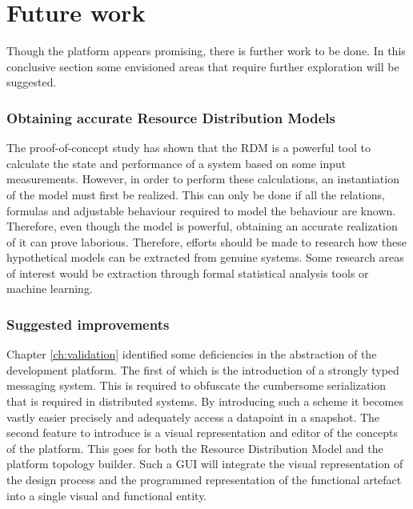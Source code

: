 \section{Future work}
Though the platform appears promising, there is further work to be done. In this conclusive section some envisioned areas that require further exploration will be suggested.

\subsubsection{Obtaining accurate Resource Distribution Models}
The proof-of-concept study has shown that the RDM is a powerful tool to calculate the state and performance of a system based on some input measurements. However, in order to perform these calculations, an instantiation of the model must first be realized. This can only be done if all the relations, formulas and adjustable behaviour required to model the behaviour are known. Therefore, even though the model is powerful, obtaining an accurate realization of it can prove laborious. Therefore, efforts should be made to research how these hypothetical models can be extracted from genuine systems. Some research areas of interest would be extraction through formal statistical analysis tools or machine learning.

\subsubsection{Suggested improvements}
Chapter \ref{ch:validation} identified some deficiencies in the abstraction of the development platform. The first of which is the introduction of a strongly typed messaging system. This is required to obfuscate the cumbersome serialization that is required in distributed systems. By introducing such a scheme it becomes vastly easier precisely and adequately access a datapoint in a snapshot.
The second feature to introduce is a visual representation and editor of the concepts of the platform. This goes for both the Resource Distribution Model and the platform topology builder. Such a GUI will integrate the visual representation of the design process and the programmed representation of the functional artefact into a single visual and functional entity.

